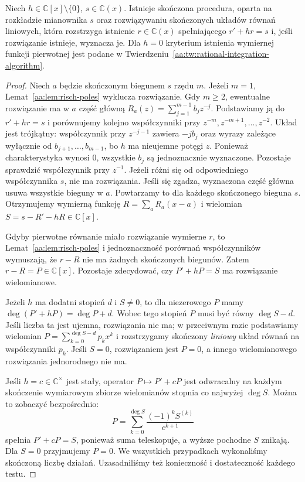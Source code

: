 \begin{twierdzenie}
\label{aa:tw:risch-polynomial-h-algorithm}
Niech $h\in\mathbb C[x]\setminus\{0\}$,
$s\in\mathbb C(x)$.
Istnieje skończona procedura,
oparta na rozkładzie mianownika
$s$ oraz rozwiązywaniu
skończonych układów równań liniowych,
która rozstrzyga istnienie
$r\in\mathbb C(x)$ spełniającego
$r'+hr=s$ i, jeśli rozwiązanie
istnieje, wyznacza je.
Dla $h=0$ kryterium
istnienia wymiernej funkcji pierwotnej
jest podane w
Twierdzeniu~\ref{aa:tw:rational-integration-algorithm}.
\end{twierdzenie}
\begin{proof}
Niech $a$ będzie skończonym biegunem
$s$ rzędu $m$. Jeżeli $m=1$,
Lemat~\ref{aa:lem:risch-poles}
wyklucza rozwiązanie.
Gdy $m\ge2$, ewentualne rozwiązanie
ma w $a$ część główną
$R_a(z)=\sum_{j=1}^{m-1}b_jz^{-j}$.
Podstawiamy ją do $r'+hr=s$
i porównujemy kolejno współczynniki
przy $z^{-m},z^{-m+1},\ldots,z^{-2}$.
Układ jest trójkątny:
współczynnik przy $z^{-j-1}$
zawiera $-j b_j$ oraz wyrazy
zależące wyłącznie od
$b_{j+1},\ldots,b_{m-1}$,
bo $h$ ma nieujemne potęgi $z$.
Ponieważ charakterystyka wynosi
$0$, wszystkie $b_j$ są
jednoznacznie wyznaczone.
Pozostaje sprawdzić współczynnik
przy $z^{-1}$. Jeżeli
różni się od odpowiedniego
współczynnika $s$, nie ma
rozwiązania. Jeśli się zgadza,
wyznaczona część główna usuwa
wszystkie bieguny w $a$.
Powtarzamy to dla każdego
skończonego bieguna $s$.
Otrzymujemy wymierną funkcję
$R=\sum_aR_a(x-a)$ i wielomian
$S=s-R'-hR\in\mathbb C[x]$.

Gdyby pierwotne równanie miało
rozwiązanie wymierne $r$,
to Lemat~\ref{aa:lem:risch-poles}
i jednoznaczność porównań
współczynników wymuszają,
że $r-R$ nie ma żadnych
skończonych biegunów.
Zatem $r-R=P\in\mathbb C[x]$.
Pozostaje zdecydować, czy
$P'+hP=S$ ma rozwiązanie wielomianowe.

Jeżeli $h$ ma dodatni stopień
$d$ i $S\ne0$, to
dla niezerowego $P$ mamy
$\deg(P'+hP)=\deg P+d$.
Wobec tego stopień $P$
musi być równy
$\deg S-d$. Jeśli liczba
ta jest ujemna, rozwiązania
nie ma; w przeciwnym razie
podstawiamy wielomian
$P=\sum_{k=0}^{\deg S-d}p_kx^k$
i rozstrzygamy skończony
\emph{liniowy} układ równań
na współczynniki $p_k$.
Jeśli $S=0$, rozwiązaniem
jest $P=0$, a innego
wielomianowego rozwiązania
jednorodnego nie ma.

Jeśli $h=c\in\mathbb C^\times$
jest stały, operator
$P\mapsto P'+cP$ jest
odwracalny na każdym
skończenie wymiarowym
zbiorze wielomianów
stopnia co najwyżej $\deg S$.
Można to zobaczyć bezpośrednio:
\[
 P=\sum_{k=0}^{\deg S}
                 \frac{(-1)^k S^{(k)}}{c^{k+1}}
\]
spełnia $P'+cP=S$, ponieważ
suma teleskopuje, a wyższe
pochodne $S$ znikają.
Dla $S=0$ przyjmujemy $P=0$.
We wszystkich przypadkach
wykonaliśmy skończoną liczbę
działań. Uzasadniliśmy też
konieczność i dostateczność
każdego testu.
\end{proof}

